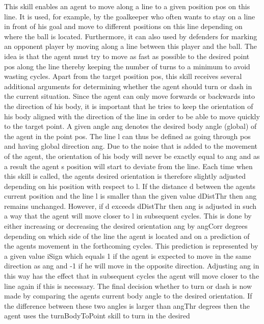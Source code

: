 This skill enables an agent to move along a line to a given position \textquotesingle{}pos\textquotesingle{} on this line. It is used, for example, by the goalkeeper who often wants to stay on a line in front of his goal and move to different positions on this line depending on where the ball is located. Furthermore, it can also used by defenders for marking an opponent player by moving along a line between this player and the ball. The idea is that the agent must try to move as fast as possible to the desired point \textquotesingle{}pos\textquotesingle{} along the line thereby keeping the number of turns to a minimum to avoid wasting cycles. Apart from the target position \textquotesingle{}pos\textquotesingle{}, this skill receives several additional arguments for determining whether the agent should turn or dash in the current situation. Since the agent can only move forwards or backwards into the direction of his body, it is important that he tries to keep the orientation of his body aligned with the direction of the line in order to be able to move quickly to the target point. A given angle \textquotesingle{}ang\textquotesingle{} denotes the desired body angle (global) of the agent in the point \textquotesingle{}pos\textquotesingle{}. The line l can thus be defined as going through \textquotesingle{}pos\textquotesingle{} and having global direction \textquotesingle{}ang\textquotesingle{}. Due to the noise that is added to the movement of the agent, the orientation of his body will never be exactly equal to \textquotesingle{}ang\textquotesingle{} and as a result the agent\textquotesingle{} s position will start to deviate from the line. Each time when this skill is called, the agent\textquotesingle{}s desired orientation is therefore slightly adjusted depending on his position with respect to l. If the distance d between the agent\textquotesingle{}s current position and the line l is smaller than the given value \textquotesingle{}d\+Dist\+Thr\textquotesingle{} then \textquotesingle{}ang\textquotesingle{} remains unchanged. However, if d exceeds \textquotesingle{}d\+Dist\+Thr\textquotesingle{} then \textquotesingle{}ang\textquotesingle{} is adjusted in such a way that the agent will move closer to l in subsequent cycles. This is done by either increasing or decreasing the desired orientation \textquotesingle{}ang\textquotesingle{} by \textquotesingle{}ang\+Corr\textquotesingle{} degrees depending on which side of the line the agent is located and on a prediction of the agent\textquotesingle{}s movement in the forthcoming cycles. This prediction is represented by a given value \textquotesingle{}i\+Sign\textquotesingle{} which equals 1 if the agent is expected to move in the same direction as \textquotesingle{}ang\textquotesingle{} and -\/1 if he will move in the opposite direction. Adjusting \textquotesingle{}ang\textquotesingle{} in this way has the effect that in subsequent cycles the agent will move closer to the line again if this is necessary. The final decision whether to turn or dash is now made by comparing the agent\textquotesingle{}s current body angle to the desired orientation. If the difference between these two angles is larger than \textquotesingle{}ang\+Thr\textquotesingle{} degrees then the agent uses the turn\+Body\+To\+Point skill to turn in the desired 